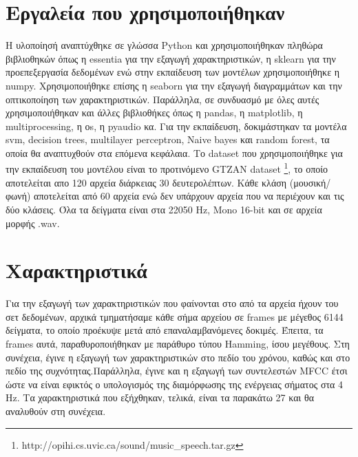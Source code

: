 \section{Εργαλεία που χρησιμοποιήθηκαν}

Η υλοποίησή αναπτύχθηκε σε γλώσσα Python και χρησιμοποιήθηκαν πληθώρα βιβλιοθηκών όπως η essentia για την εξαγωγή χαρακτηριστικών, η sklearn για την προεπεξεργασία δεδομένων
ενώ στην εκπαίδευση των μοντέλων χρησιμοποιήθηκε η numpy. Χρησιμοποιήθηκε επίσης η  seaborn για την εξαγωγή διαγραμμάτων και την οπτικοποίηση των χαρακτηριστικών. Παράλληλα, σε συνδυασμό με όλες αυτές χρησιμοποιήθηκαν και άλλες βιβλιοθήκες όπως η pandas,  η matplotlib, η multiprocessing, η  οs, η pyaudio κα. Για την εκπαίδευση, δοκιμάστηκαν τα μοντέλα svm, decision trees, multilayer perceptron, Naive bayes και random forest, τα οποία θα αναπτυχθούν στα επόμενα κεφάλαια. Το dataset που χρησιμοποιήθηκε για την εκπαίδευση του μοντέλου είναι το προτινόμενο GTZAN dataset \footnote{http://opihi.cs.uvic.ca/sound/music\_speech.tar.gz}, το οποίο αποτελείται απο 120 αρχεία διάρκειας 30 δευτερολέπτων. Κάθε κλάση (μουσική/φωνή) αποτελείται από 60 αρχεία ενώ δεν υπάρχουν αρχεία που να περιέχουν και τις δύο κλάσεις. Όλα τα δείγματα είναι στα 22050 Hz, Mono 16-bit και σε αρχεία μορφής .wav.

\section{Χαρακτηριστικά}

Για την εξαγωγή των χαρακτηριστικών που φαίνονται στο από τα αρχεία ήχουν του σετ δεδομένων, αρχικά τμηματήσαμε κάθε σήμα αρχείου σε frames με μέγεθος 6144 δείγματα, το οποίο προέκυψε μετά από επαναλαμβανόμενες δοκιμές.
 Έπειτα, τα frames αυτά, παραθυροποιήθηκαν με παράθυρο τύπου Hamming, ίσου μεγέθους. Στη συνέχεια, έγινε η εξαγωγή των χαρακτηριστικών στο πεδίο του χρόνου, καθώς και στο πεδίο της συχνότητας.Παράλληλα, έγινε και η εξαγωγή των συντελεστών MFCC έτσι ώστε να είναι εφικτός ο υπολογισμός της διαμόρφωσης της ενέργειας σήματος στα 4 Ηz. Τα χαρακτηριστικά που εξήχθηκαν, τελικά, είναι τα παρακάτω 27 και θα αναλυθούν στη συνέχεια.


